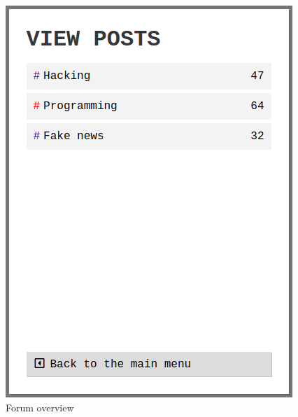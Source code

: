 \begin{table}[H]
\begin{minipage}{.33\textwidth}
\begin{figure}[H]
            \includegraphics[width=0.95\linewidth]{InteraktionsDesign/Assets/Prototype/5.png}
            \caption{Forum overview}
            \label{fig:prototype5}
        \end{figure}
    \end{minipage}
    \begin{minipage}{.33\textwidth}
        \begin{figure}[H]
            \centering

\end{figure}
\end{minipage}
\end{table}
